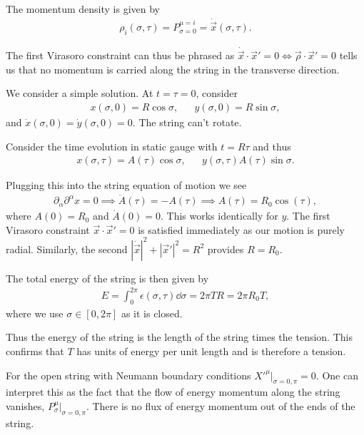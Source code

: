 The momentum density is given by
\begin{align}
    \rho_i \left( \sigma, \tau \right) = P^{\mu = i}_{\sigma = 0} = \dot{\vec{x}}\left( \sigma , \tau \right) 
.\end{align}

The first Virasoro constraint can thus be phrased as $\dot{\vec{x}} \cdot \vec{x}' = 0 \iff \vec{\rho} \cdot \vec{x}' = 0$ tells us that no momentum is carried along the string in the transverse direction.

We consider a simple solution. At $t = \tau = 0$, consider
\begin{align}
    x \left( \sigma, 0 \right) = R \cos \sigma,  && y\left( \sigma,0 \right)  = R \sin \sigma
,\end{align}
and $\dot{x}\left( \sigma, 0 \right) = \dot{y}\left( \sigma, 0 \right) = 0$.
The string can't rotate.

Consider the time evolution in static gauge with $t = R \tau$ and thus
\begin{align}
    x \left( \sigma, \tau \right) = A \left( \tau \right) \cos \sigma, && y \left( \sigma, \tau \right) A \left( \tau \right) \sin \sigma
.\end{align}

Plugging this into the string equation of motion we see
\begin{align}
    \partial_\alpha \partial^{\alpha} x = 0 \implies \ddot{A}\left( \tau \right) = -A \left( \tau \right)  \implies A \left( \tau \right) = R_0 \cos \left( \tau \right) 
,\end{align}
where $A\left( 0 \right) = R_0$ and $\dot{A}\left( 0 \right) = 0$. This works identically for $y$. The first Virasoro constraint $\vec{x}\cdot \vec{x}' = 0$ is satisfied immediately as our motion is purely radial. Similarly, the second $\left| \dot{\vec{x}} \right|^2 + \left| \vec{x}' \right|^2 = R^2$ provides $R = R_0$.

The total energy of the string is then given by
\begin{align}
    E = \int_0^{2\pi} \epsilon \left( \sigma, \tau \right)  \dd{\sigma} = 2\pi T R = 2 \pi R_0 T
,\end{align}
where we use $\sigma \in \left[ 0,2\pi \right] $ as it is closed.

Thus the energy of the string is the length of the string times the tension. This confirms that $T$ has units of energy per unit length and is therefore a tension.


For the open string with Neumann boundary conditions $X'^{\mu} \bigg|_{\sigma = 0, \pi} = 0$. One can interpret this as the fact that the flow of energy momentum along the string vanishes, $P_{\sigma}^{\mu} \bigg|_{\sigma = 0, \pi}$. There is no flux of energy momentum out of the ends of the string.

